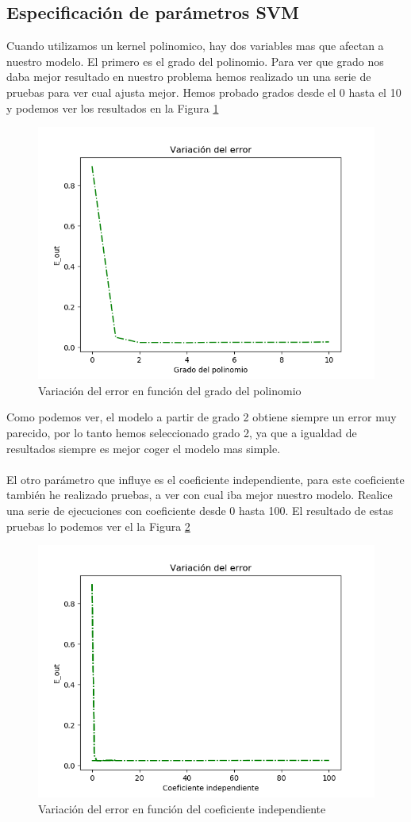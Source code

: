 \documentclass[12pt,a4paper]{article}
\begin{document}
\subsection{Especificación de parámetros SVM}
Cuando utilizamos un kernel polinomico, hay dos variables mas que afectan a nuestro modelo. El primero es el grado del polinomio. Para ver que grado nos daba mejor resultado en nuestro problema hemos realizado un una serie de pruebas para ver cual ajusta mejor. Hemos probado grados desde el 0 hasta el 10 y podemos ver los resultados en la Figura \ref{fig:errorsvm}
 \begin{figure}[H]
 	\centering
 	\includegraphics[width=0.7\linewidth]{images/errorsvm.png}
 	\caption[Variación del error en función del grado del polinomio]{Variación del error en función del grado del polinomio}
 	\label{fig:errorsvm}
 \end{figure}
Como podemos ver, el modelo a partir de grado 2 obtiene siempre un error muy parecido, por lo tanto hemos seleccionado grado 2, ya que a igualdad de resultados siempre es mejor coger el modelo mas simple. \\\\
El otro parámetro que influye es el coeficiente independiente, para este coeficiente también he realizado pruebas, a ver con cual iba mejor nuestro modelo. Realice una serie de ejecuciones con coeficiente desde 0 hasta 100. El resultado de estas pruebas lo podemos ver el la Figura \ref{fig:errorCoeficientesvm}
 \begin{figure}[H]
	\centering
	\includegraphics[width=0.7\linewidth]{images/errorCoefIndependietesvm.png}
	\caption[Variación del error en función del coeficiente independiente]{Variación del error en función del coeficiente independiente}
	\label{fig:errorCoeficientesvm}
\end{figure}
\end{document}
